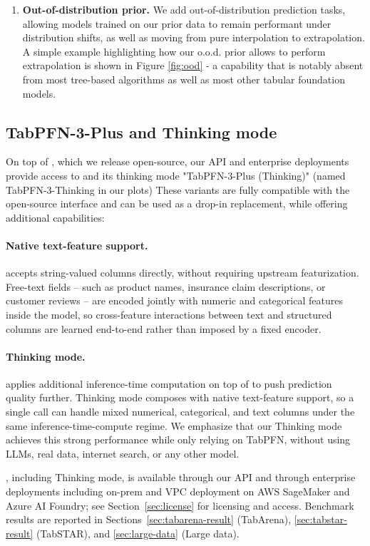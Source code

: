 \begin{enumerate}
    
    \item \textbf{Out-of-distribution prior.} We add out-of-distribution prediction tasks, allowing models trained on our prior data to remain performant under distribution shifts, as well as moving from pure interpolation to extrapolation. A simple example highlighting how our o.o.d. prior allows \ourmodel to perform extrapolation is shown in Figure \ref{fig:ood} - a capability that is notably absent from most tree-based algorithms as well as most other tabular foundation models.
    
\end{enumerate}


\subsection{TabPFN-3-Plus and Thinking mode}
\label{sec:tabpfn3plus}

On top of \ourmodel, which we release open-source, our API and enterprise deployments provide access to \ourmodelplus and its thinking mode "TabPFN-3-Plus (Thinking)" (named TabPFN-3-Thinking in our plots)
These variants are fully compatible with the open-source \ourmodel interface and can be used as a drop-in replacement, while offering additional capabilities:

\paragraph{Native text-feature support.} \ourmodelplus accepts string-valued columns directly, without requiring upstream featurization. Free-text fields -- such as product names, insurance claim descriptions, or customer reviews -- are encoded jointly with numeric and categorical features inside the model, so cross-feature interactions between text and structured columns are learned end-to-end rather than imposed by a fixed encoder.

\paragraph{Thinking mode.} \ourmodelenhanced applies additional inference-time computation on top of \ourmodelplus to push prediction quality further. Thinking mode composes with native text-feature support, so a single call can handle mixed numerical, categorical, and text columns under the same inference-time-compute regime. We emphasize that our Thinking mode achieves this strong performance while only relying on TabPFN, without using LLMs, real data, internet search, or any other model.

\ourmodelplus, including Thinking mode, is available through our API and through enterprise deployments including on-prem and VPC deployment on AWS SageMaker and Azure AI Foundry; see Section~\ref{sec:license} for licensing and access. Benchmark results are reported in Sections~\ref{sec:tabarena-result} (TabArena), \ref{sec:tabstar-result} (TabSTAR), and \ref{sec:large-data} (Large data).
\FloatBarrier
